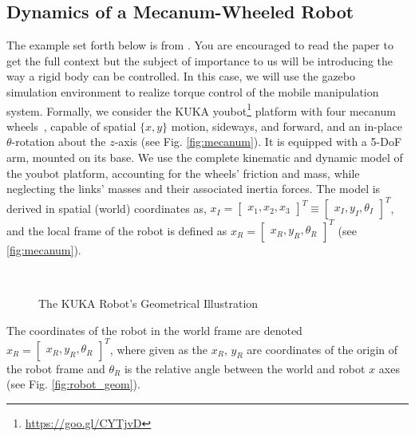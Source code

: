\subsection{Dynamics of a Mecanum-Wheeled Robot}
%
The example set forth below is from \cite{Ogunmolu18IROS}. You are encouraged to read the paper to get the full context but the subject of importance to us will be introducing the way a rigid body can be controlled. In this case, we will use the gazebo simulation environment to realize torque control of the mobile manipulation system.  Formally,  we consider the KUKA youbot\footnote{\href{https://goo.gl/CYTjvD}{https://goo.gl/CYTjvD}} platform with four mecanum wheels~\cite{mecanum}, capable of spatial $\{x,y\}$ motion, \ie sideways, and forward, and an in-place $\theta$-rotation about the $z$-axis (see Fig. \autoref{fig:mecanum}). It is equipped with a 5-DoF arm, mounted on its base. We use the complete kinematic and dynamic model of the youbot platform, accounting for the wheels' friction and mass, while neglecting the links' masses and their associated inertia forces. %
The model is derived in spatial (world) coordinates as, $\textit{x}_I = \begin{bmatrix}\textit{x}_1, \textit{x}_2, \textit{x}_3\end{bmatrix}^T \equiv \begin{bmatrix}x_I, y_I, \theta_I\end{bmatrix}^T$, and the local frame of the robot is defined as $\textit{x}_R = \begin{bmatrix}x_R, y_R, \theta_R\end{bmatrix}^T$ (see \autoref{fig:mecanum}).
%
\begin{figure}[tb]
	\centering
	~ %
	\caption{The KUKA Robot's Geometrical Illustration}
\end{figure}
%
The coordinates of the robot in the world frame are  denoted $\textit{x}_R = \begin{bmatrix}x_R, y_R, \theta_R\end{bmatrix}^T$, where given as the $x_R,\,y_R$ are coordinates of the origin of the robot frame and $\theta_R$ is the relative angle between the  world and robot $x$ axes (see Fig. \autoref{fig:robot_geom}).

